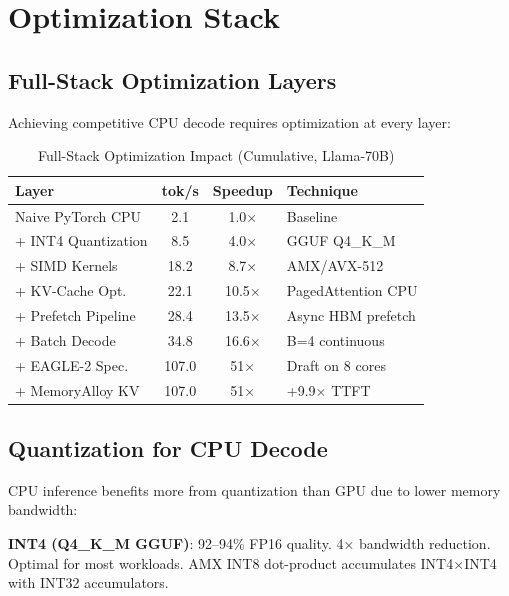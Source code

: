 \documentclass[conference,10pt]{IEEEtran}
\begin{document}
\section{Optimization Stack}
\label{sec:optstack}

\subsection{Full-Stack Optimization Layers}

Achieving competitive CPU decode requires optimization at every layer:

\begin{table}[!htbp]
\caption{Full-Stack Optimization Impact (Cumulative, Llama-70B)}
\label{tab:optstack}
\centering\footnotesize
\begin{tabular}{@{}lccl@{}}
\toprule
\textbf{Layer} & \textbf{tok/s} & \textbf{Speedup} & \textbf{Technique} \\
\midrule
Naive PyTorch CPU & 2.1 & 1.0$\times$ & Baseline \\
+ INT4 Quantization & 8.5 & 4.0$\times$ & GGUF Q4\_K\_M \\
+ SIMD Kernels & 18.2 & 8.7$\times$ & AMX/AVX-512 \\
+ KV-Cache Opt. & 22.1 & 10.5$\times$ & PagedAttention CPU \\
+ Prefetch Pipeline & 28.4 & 13.5$\times$ & Async HBM prefetch \\
+ Batch Decode & 34.8 & 16.6$\times$ & B=4 continuous \\
+ EAGLE-2 Spec. & 107.0 & 51$\times$ & Draft on 8 cores \\
+ MemoryAlloy KV & 107.0 & 51$\times$ & +9.9$\times$ TTFT \\
\bottomrule
\end{tabular}
\end{table}

\subsection{Quantization for CPU Decode}

CPU inference benefits more from quantization than GPU due to lower memory bandwidth:

\textbf{INT4 (Q4\_K\_M GGUF)}: 92--94\% FP16 quality. 4$\times$ bandwidth reduction. Optimal for most workloads. AMX INT8 dot-product accumulates INT4$\times$INT4 with INT32 accumulators.
\end{document}

